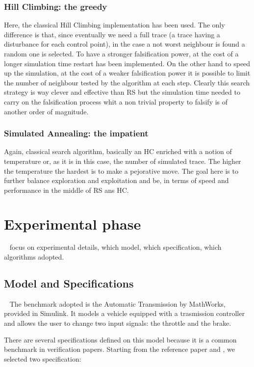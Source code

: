 \documentclass[11pt]{article}
\begin{document}
\subsubsection{Hill Climbing: the greedy}
Here, the classical Hill Climbing implementation has been used. The only difference is that, since eventually we need a full trace (a trace having a disturbance for each control point), in the case a not worst neighbour is found a random one is selected. To have a stronger falsification power, at the cost of a longer simulation time restart has been implemented. On the other hand to speed up the simulation, at the cost of a weaker falsification power it is possible to limit the number of
neighbour tested by the algorithm at each step. 
Clearly this search strategy is way clever and effective than RS but the simulation time needed to carry on the falsification process whit a non trivial property to falsify is of another order of magnitude.

\subsubsection{Simulated Annealing: the impatient}
Again, classical search algorithm, basically an HC enriched with a notion of temperature or, as it is in this case, the number of simulated trace. The higher the temperature the hardest is to make a pejorative move. 
The goal here is to further balance exploration and exploitation and be, in terms of speed and performance in the middle of RS ans HC.
\pagebreak

\section{Experimental phase}~\label{sec:exp}
focus on experimental details, which model, which specification, which algorithms adopted.

\subsection{Model and Specifications}~\label{sec:exp:spec}
The benchmark adopted is the Automatic Transmission by MathWorks, provided in Simulink. It models a vehicle equipped with a trasmission controller and allows the user to change two input signals: the     throttle and the brake.

There are several specifications defined on this model because it is a common benchmark in verification papers. Starting from the reference paper and \cite{bardh2014benchmarks}, we selected two           specification:
\end{document}
